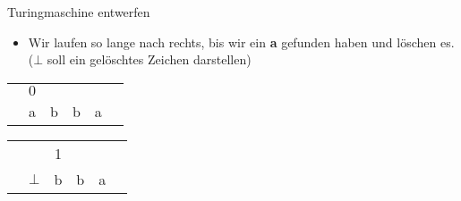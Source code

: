 \begin{frame}{Turingmaschine entwerfen}
\begin{itemize}
\item Wir laufen so lange nach rechts, bis wir ein \textbf{a} gefunden haben und l\"oschen es. ($\bot$ soll ein gel\"oschtes Zeichen darstellen)
\end{itemize}
\pause
\begin{minipage}{0.7\textwidth}
\end{minipage}
\begin{minipage}{0.25\textwidth}
\tiny{
\begin{tabular}{cccccc}
 & $0$ & & & & \\
 \textvisiblespace & a & b & b & a & \textvisiblespace \\
\end{tabular}
\begin{tabular}{cccccc}
 & & 1 & & & \\
 \textvisiblespace & $\bot$ & b & b & a & \textvisiblespace \\
\end{tabular}
}
\end{minipage}
\end{frame}

